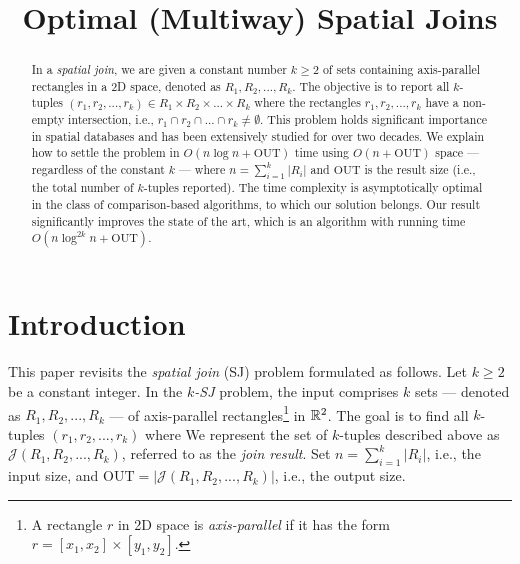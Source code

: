 \documentclass[sigconf]{acmart}
\def\J{\mathcal{J}}
\def\out{\mathrm{OUT}}
\begin{document}
    
\title{Optimal (Multiway) Spatial Joins}


\author{}


\begin{abstract}
    In a {\em spatial join}, we are given a constant number $k \geq 2$ of sets containing axis-parallel rectangles in a 2D space, denoted as $R_1, R_2, ..., R_k$. The objective is to report all $k$-tuples $(r_1, r_2, ..., r_k) \in R_1 \times R_2 \times ... \times R_k$ where the rectangles $r_1, r_2, ..., r_k$ have a non-empty intersection, i.e., $r_1 \cap r_2 \cap ... \cap r_k \neq \emptyset$. This problem holds significant importance in spatial databases and has been extensively studied for over two decades. We explain how to settle the problem in $O(n \log n + \out)$ time using $O(n + \out)$ space --- regardless of the constant $k$ --- where $n = \sum_{i=1}^k |R_i|$ and $\out$ is the result size (i.e., the total number of $k$-tuples reported). The time complexity is asymptotically optimal in the class of comparison-based algorithms, to which our solution belongs. Our result significantly improves the state of the art, which is an algorithm with running time $O(n \log^{2k} n + \out)$.
\end{abstract}

\maketitle 

\section{Introduction} \label{sec:intro}

This paper revisits the {\em spatial join} (SJ) problem formulated as follows. Let $k \ge 2$ be a constant integer. In the {\em $k$-SJ} problem, the input comprises $k$ sets --- denoted as $R_1, R_2, ..., R_k$ --- of axis-parallel rectangles\footnote{A rectangle $r$ in 2D space is {\em axis-parallel} if it has the form $r = [x_1, x_2] \times [y_1, y_2]$.} in $\mathbb{R}^2$. The goal is to find all $k$-tuples $(r_1, r_2, ..., r_k)$ where
We represent the set of $k$-tuples described above as $\J(R_1, R_2, ..., R_k)$, referred to as the {\em join result}. Set $n = \sum_{i=1}^k |R_i|$, i.e., the input size, and $\out = |\J(R_1, R_2, ..., R_k)|$, i.e., the output size.
\end{document}
